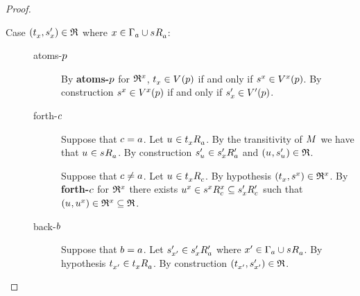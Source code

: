 \begin{proof}
\begin{description}
    \item[{Case $(\kStateT_x, \kStateSP_x) \in \refinement$ where $x \in \Gamma_\agentA \cup \kSuccessorsA{\kStateS}$:}]
        \hfill
        \begin{description}
            \item[atoms-$\atomP$] 
                By {\bf atoms-$\atomP$} for $\refinement^x$, $\kStateT_x \in \kValuation(\atomP)$ if and only if $\kStateS[x] \in \kValuation[x](\atomP)$.
                By construction $\kStateS[x] \in \kValuation[x](\atomP)$ if and only if $\kStateSP_x \in \kValuationP(\atomP)$.
            \item[forth-$\agentC$]
                Suppose that $\agentC = \agentA$.
                Let $\kStateU \in \kSuccessorsA{\kStateT_x}$.
                By the transitivity of $\kModel$ we have that $\kStateU \in \kSuccessorsA{\kStateS}$.
                By construction $\kStateSP_{\kStateU} \in \kSuccessorsPA{\kStateSP_x}$ and $(\kStateU, \kStateSP_{\kStateU}) \in \refinement$.

                Suppose that $\agentC \neq \agentA$.
                Let $\kStateU \in \kSuccessorsC{\kStateT_x}$.
                By hypothesis $(\kStateT_x, \kStateS[x]) \in \refinement^x$.
                By {\bf forth-$\agentC$} for $\refinement^x$ there exists $\kStateU[x] \in \kSuccessorsC[x]{\kStateS[x]} \subseteq \kSuccessorsPC{\kStateSP_x}$ such that $(\kStateU, \kStateU[x]) \in \refinement^x \subseteq \refinement$.
            \item[back-$\agentB$]
                Suppose that $\agentB = \agentA$.
                Let $\kStateSP_{x'} \in \kSuccessorsPA{\kStateSP_x}$ where $x' \in \Gamma_\agentA \cup \kSuccessorsA{\kStateS}$.
                By hypothesis $\kStateT_{x'} \in \kSuccessorsA{\kStateT_x}$.
                By construction $(\kStateT_{x'}, \kStateSP_{x'}) \in \refinement$.


\end{description}
\end{description}
\end{proof}
